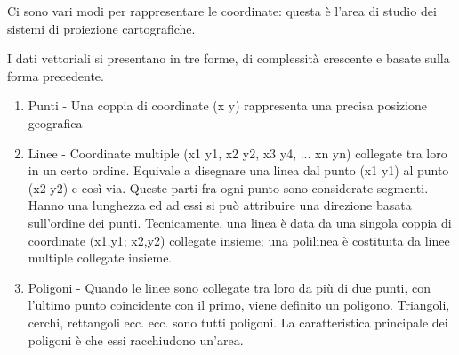 Ci sono vari modi per rappresentare le coordinate: questa è l'area di studio dei
sistemi di proiezione cartografiche.

I dati vettoriali si presentano in tre forme, di complessità crescente
e basate sulla forma precedente.

\begin{enumerate}
\item Punti - Una coppia di coordinate (x y) rappresenta una precisa posizione geografica
\item Linee - Coordinate multiple (x1 y1, x2 y2, x3 y4, ... xn yn) collegate
tra loro in un certo ordine. Equivale a disegnare una linea dal punto (x1 y1)
al punto (x2 y2) e così via. Queste parti fra ogni punto sono considerate segmenti.
Hanno una lunghezza ed ad essi si può attribuire una direzione basata sull'ordine
dei punti. Tecnicamente, una linea è data da una singola coppia di coordinate (x1,y1; x2,y2)
collegate insieme; una polilinea è costituita da linee multiple collegate insieme.
\item Poligoni - Quando le linee sono collegate tra loro da più di due punti,
con l'ultimo punto coincidente con il primo, viene definito un poligono.
Triangoli, cerchi, rettangoli ecc. ecc. sono tutti poligoni. La caratteristica
principale dei poligoni è che essi racchiudono un'area. 
\end{enumerate}
